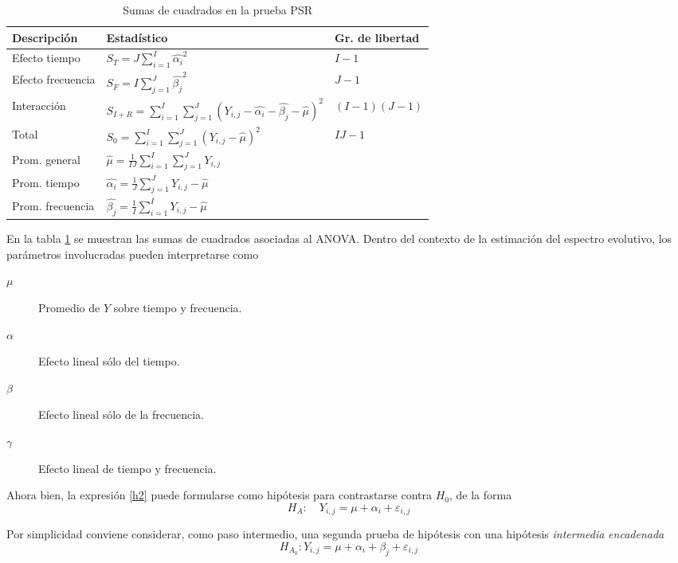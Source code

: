 \documentclass[12pt,letterpaper]{book}
\newcommand{\bordes}[1]{\renewcommand{\arraystretch}{#1}}
\newcommand{\midrulec}{%
  \arrayrulecolor{gris}\specialrule{\aboverulesep}{0pt}{0pt}
  \arrayrulecolor{black}\specialrule{\lightrulewidth}{0pt}{\belowrulesep}
}
\begin{document}
\begin{table}
\label{cantidades_psr}
\caption{Sumas de cuadrados en la prueba PSR}
\centering
\bordes{1.1}
\begin{tabular}{lll}
\toprule
Descripción & Estadístico & {Gr. de libertad} \\
\midrule
Efecto tiempo &
$S_T =J \sum_{i=1}^{I} \widehat{\alpha_i}^{2}$ 
& $I-1$ \\
Efecto frecuencia &
$S_F = I \sum_{j=1}^{J} \widehat{\beta_j}^{2}$ 
& $J-1$ \\
Interacción &
$S_{I+R} = \sum_{i=1}^{I} \sum_{j=1}^{J} 
\left( Y_{i,j} - \widehat{\alpha_i} - \widehat{\beta_j} - \widehat{\mu} \right)^{2}$ 
& $(I-1)(J-1)$ \\
\rowcolor{gris}
Total &
$S_{0} = \sum_{i=1}^{I} \sum_{j=1}^{J} 
\left( Y_{i,j} - \widehat{\mu} \right)^{2}$ 
& $IJ -1$ \\
\midrulec
Prom. general &
$\widehat{\mu} = \frac{1}{I J} \sum_{i=1}^{I} \sum_{j=1}^{J} Y_{i,j}$ & \\
Prom. tiempo &
$\widehat{\alpha_i} = \frac{1}{J} \sum_{j=1}^{J} Y_{i,j} - \widehat{\mu}$ & \\
Prom. frecuencia &
$\widehat{\beta_j} = \frac{1}{I} \sum_{i=1}^{I} Y_{i,j} - \widehat{\mu}$ & \\
\bottomrule
\end{tabular}
\end{table}

En la tabla \ref{cantidades_psr} se muestran las sumas de cuadrados asociadas al ANOVA.
%
Dentro del contexto de la estimación del espectro evolutivo, los parámetros involucradas pueden interpretarse como
\begin{description}
\item[$\mu$] Promedio de $Y$ sobre tiempo y frecuencia.
\item[$\alpha$] Efecto lineal sólo del tiempo.
\item[$\beta$] Efecto lineal sólo de la frecuencia.
\item[$\gamma$] Efecto lineal de tiempo y frecuencia.
\end{description}

Ahora bien, la expresión \ref{h2} puede formularse como hipótesis para contrastarse contra $H_0$, de la forma
%
\begin{equation}
H_A : \hspace{1em} Y_{i,j} = \mu + \alpha_i + \varepsilon_{i,j}
\end{equation}

Por simplicidad conviene considerar, como paso intermedio, una segunda prueba de hipótesis con una hipótesis \textit{intermedia} \textit{encadenada}
\begin{equation}
H_{A_0} : Y_{i,j} = \mu + \alpha_i + \beta_j + \varepsilon_{i,j}
\end{equation}
\end{document}
